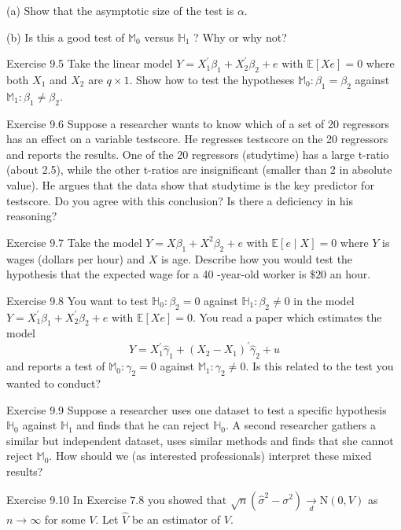 \documentclass[10pt]{article}
\begin{document}
(a) Show that the asymptotic size of the test is $\alpha$.

(b) Is this a good test of $\mathbb{M}_{0}$ versus $\mathbb{H}_{1}$ ? Why or why not?

Exercise 9.5 Take the linear model $Y=X_{1}^{\prime} \beta_{1}+X_{2}^{\prime} \beta_{2}+e$ with $\mathbb{E}[X e]=0$ where both $X_{1}$ and $X_{2}$ are $q \times 1$. Show how to test the hypotheses $\mathbb{M}_{0}: \beta_{1}=\beta_{2}$ against $\mathbb{M}_{1}: \beta_{1} \neq \beta_{2}$.

Exercise 9.6 Suppose a researcher wants to know which of a set of 20 regressors has an effect on a variable testscore. He regresses testscore on the 20 regressors and reports the results. One of the 20 regressors (studytime) has a large t-ratio (about 2.5), while the other t-ratios are insignificant (smaller than 2 in absolute value). He argues that the data show that studytime is the key predictor for testscore. Do you agree with this conclusion? Is there a deficiency in his reasoning?

Exercise 9.7 Take the model $Y=X \beta_{1}+X^{2} \beta_{2}+e$ with $\mathbb{E}[e \mid X]=0$ where $Y$ is wages (dollars per hour) and $X$ is age. Describe how you would test the hypothesis that the expected wage for a 40 -year-old worker is $\$ 20$ an hour.

Exercise 9.8 You want to test $\mathbb{H}_{0}: \beta_{2}=0$ against $\mathbb{H}_{1}: \beta_{2} \neq 0$ in the model $Y=X_{1}^{\prime} \beta_{1}+X_{2}^{\prime} \beta_{2}+e$ with $\mathbb{E}[X e]=0$. You read a paper which estimates the model
$$
Y=X_{1}^{\prime} \widehat{\gamma}_{1}+\left(X_{2}-X_{1}\right)^{\prime} \widehat{\gamma}_{2}+u
$$
and reports a test of $\mathbb{M}_{0}: \gamma_{2}=0$ against $\mathbb{M}_{1}: \gamma_{2} \neq 0$. Is this related to the test you wanted to conduct?

Exercise 9.9 Suppose a researcher uses one dataset to test a specific hypothesis $\mathbb{H}_{0}$ against $\mathbb{H}_{1}$ and finds that he can reject $\mathbb{H}_{0}$. A second researcher gathers a similar but independent dataset, uses similar methods and finds that she cannot reject $\mathbb{M}_{0}$. How should we (as interested professionals) interpret these mixed results?

Exercise 9.10 In Exercise $7.8$ you showed that $\sqrt{n}\left(\widehat{\sigma}^{2}-\sigma^{2}\right) \underset{d}{\rightarrow} \mathrm{N}(0, V)$ as $n \rightarrow \infty$ for some $V$. Let $\widehat{V}$ be an estimator of $V$.
\end{document}
